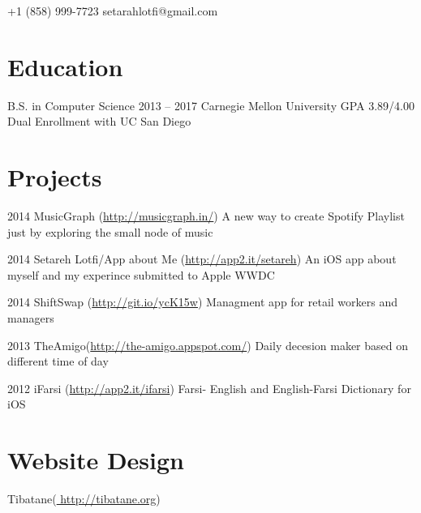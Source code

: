 \documentclass{tccv}
\begin{document}
    {+1 (858) 999-7723}
    {setarahlotfi@gmail.com}

\section{Education}

\begin{yearlist}

\item[B.S. in Computer Science]{2013 -- 2017}
     {Carnegie Mellon University}
     {GPA 3.89/4.00               
     Dual Enrollment with UC San Diego}
\end{yearlist}

\section{Projects}

\begin{yearlist}

\item{2014}
     {MusicGraph (\href{http://musicgraph.in/}{http://musicgraph.in/})}
     {A new way to create Spotify Playlist just by exploring the small node of music}

\item{2014}
     {Setareh Lotfi/App about Me (\href{http://app2.it/setareh}{http://app2.it/setareh})}
     {An iOS app about myself and my experince submitted to Apple WWDC}

\item{2014}
     {ShiftSwap (\href{http://git.io/ycK15w}{http://git.io/ycK15w})}
     {Managment app for retail workers and managers}

\item{2013}
     {TheAmigo(\href{http://the-amigo.appspot.com//}{http://the-amigo.appspot.com/})}
     {Daily decesion maker based on different time of day}

\item{2012}
     {iFarsi (\href{http://app2.it/ifarsi}{http://app2.it/ifarsi})}
     {Farsi- English and English-Farsi Dictionary for iOS}

\end{yearlist}
\section{Website Design}

\begin{factlist}
\item{Tibatane}{(\href{http://tibatane.org}{                http://tibatane.org})}

\end{factlist}
\end{document}
